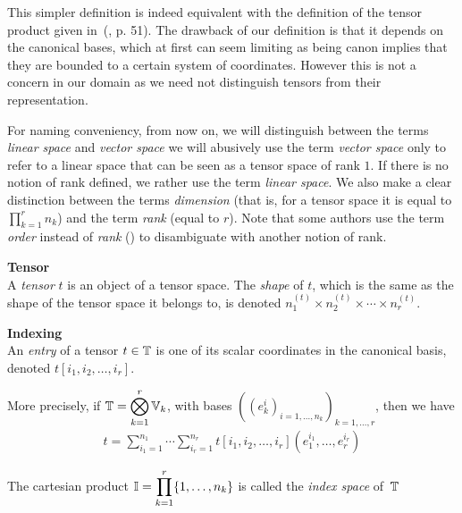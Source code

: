 \begin{remark}
This simpler definition is indeed equivalent with the definition of the tensor product given in~(\cite{hackbusch2012tensor}, p. 51). The drawback of our definition is that it depends on the canonical bases, which at first can seem limiting as being canon implies that they are bounded to a certain system of coordinates. However this is not a concern in our domain as we need not distinguish tensors from their representation.
\end{remark}

\begin{remark}
For naming conveniency, from now on, we will distinguish between the terms \emph{linear space} and \emph{vector space} \ie we will abusively use the term \emph{vector space} only to refer to a linear space that can be seen as a tensor space of rank $1$. If there is no notion of rank defined, we rather use the term \emph{linear space}.
We also make a clear distinction between the terms \emph{dimension} (that is, for a tensor space it is equal to $\displaystyle \prod_{k=1}^r n_k$) and the term \emph{rank} (equal to $r$). Note that some authors use the term \emph{order} instead of \emph{rank} (\eg \cite{hackbusch2012tensor}) to disambiguate with another notion of rank.
\end{remark}

\begin{definition}\textbf{Tensor}\\
A \emph{tensor} $t$ is an object of a tensor space. The \emph{shape} of $t$, which is the same as the shape of the tensor space it belongs to, is denoted $n_1^{(t)} \times n_2^{(t)} \times \cdots \times n_r^{(t)}$.
\end{definition}

\begin{definition}\textbf{Indexing}\\
An \emph{entry} of a tensor $t \in \mathbb{T}$ is one of its scalar coordinates in the canonical basis, denoted $t[i_1, i_2, \ldots, i_r]$.

More precisely, if $\mathbb{T} = \displaystyle \bigotimes_{k=1}^r \mathbb{V}_k$, with bases $((e_k^i)_{i=1,\ldots,n_k})_{k=1,\ldots,r}$, then we have
\begin{gather*}
t =  \displaystyle \sum_{i_1=1}^{n_1} \cdots \sum_{i_r=1}^{n_r} t[i_1, i_2, \ldots, i_r] (e_1^{i_1}, \ldots, e_r^{i_r})
\end{gather*}

The cartesian product $\mathbb{I}=\displaystyle \prod_{k=1}^r \{1, \ldots, n_k \}$ is called the \emph{index space} of~$\mathbb{T}$
\end{definition}

